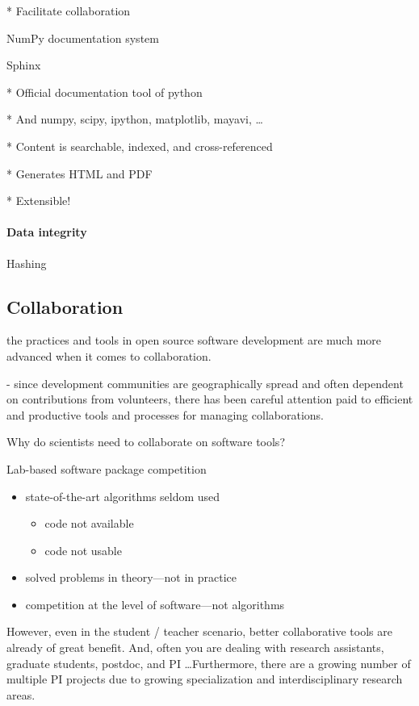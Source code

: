 \documentclass[ChapterTOCs,krantz2]{krantz} %
\begin{document}
* Facilitate collaboration

NumPy documentation system \cite{SciPyProceedings_27}

Sphinx

* Official documentation tool of python

* And numpy, scipy, ipython, matplotlib, mayavi, \ldots

* Content is searchable, indexed, and cross-referenced

* Generates HTML and PDF

* Extensible!

\paragraph{ {\bf Data integrity}}

Hashing


\subsection{Collaboration}

the practices and tools in open source software development
are much more advanced when it comes to collaboration.

- since development communities are geographically spread
and often dependent on contributions from volunteers, there
has been careful attention paid to efficient and productive
tools and processes for managing collaborations.

Why do scientists need to collaborate on software tools?

Lab-based software package competition

\begin{itemize}
\item  state-of-the-art algorithms seldom used

\begin{itemize}
\item code not available
\item code not usable
\end{itemize}

\item solved problems in theory---not in practice
\item competition at the level of software---not algorithms
\end{itemize}

However, even in the student / teacher scenario, better collaborative tools
are already of great benefit.  And, often you are dealing with research
assistants, graduate students, postdoc, and PI \ldots  Furthermore, there are a
growing number of multiple PI projects due to growing specialization and
interdisciplinary research areas.
\end{document}
